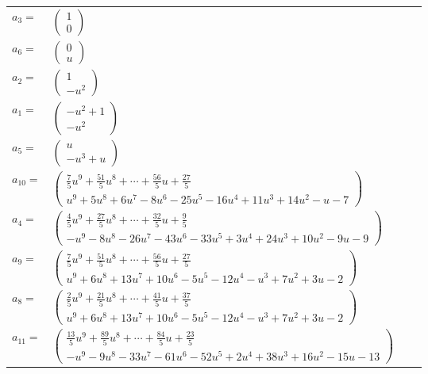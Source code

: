 \documentclass[1p]{elsarticle_modified}
\theoremstyle{definition}
\begin{document}
\begin{tabular}{m{7pt} m{180pt} m{7pt} m{180pt} }
\flushright $a_{3}=$&$\begin{pmatrix}1\\0\end{pmatrix}$ \\
\flushright $a_{6}=$&$\begin{pmatrix}0\\u\end{pmatrix}$ \\
\flushright $a_{2}=$&$\begin{pmatrix}1\\- u^2\end{pmatrix}$ \\
\flushright $a_{1}=$&$\begin{pmatrix}- u^2+1\\- u^2\end{pmatrix}$ \\
\flushright $a_{5}=$&$\begin{pmatrix}u\\- u^3+u\end{pmatrix}$ \\
\flushright $a_{10}=$&$\begin{pmatrix}\frac{7}{5} u^9+\frac{51}{5} u^8+\cdots+\frac{56}{5} u+\frac{27}{5}\\u^9+5 u^8+6 u^7-8 u^6-25 u^5-16 u^4+11 u^3+14 u^2- u-7\end{pmatrix}$ \\
\flushright $a_{4}=$&$\begin{pmatrix}\frac{4}{5} u^9+\frac{27}{5} u^8+\cdots+\frac{32}{5} u+\frac{9}{5}\\- u^9-8 u^8-26 u^7-43 u^6-33 u^5+3 u^4+24 u^3+10 u^2-9 u-9\end{pmatrix}$ \\
\flushright $a_{9}=$&$\begin{pmatrix}\frac{7}{5} u^9+\frac{51}{5} u^8+\cdots+\frac{56}{5} u+\frac{27}{5}\\u^9+6 u^8+13 u^7+10 u^6-5 u^5-12 u^4- u^3+7 u^2+3 u-2\end{pmatrix}$ \\
\flushright $a_{8}=$&$\begin{pmatrix}\frac{2}{5} u^9+\frac{21}{5} u^8+\cdots+\frac{41}{5} u+\frac{37}{5}\\u^9+6 u^8+13 u^7+10 u^6-5 u^5-12 u^4- u^3+7 u^2+3 u-2\end{pmatrix}$ \\
\flushright $a_{11}=$&$\begin{pmatrix}\frac{13}{5} u^9+\frac{89}{5} u^8+\cdots+\frac{84}{5} u+\frac{23}{5}\\- u^9-9 u^8-33 u^7-61 u^6-52 u^5+2 u^4+38 u^3+16 u^2-15 u-13\end{pmatrix}$ \\

\end{tabular}
\end{document}
